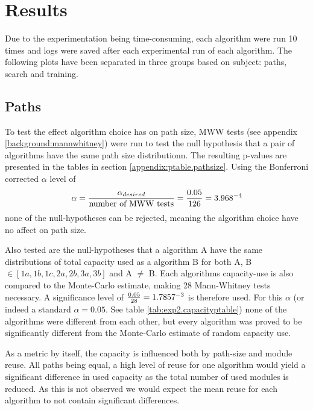 \section{Results}
\label{exp2:results}
Due to the experimentation being time-consuming, each algorithm were run 10 times and logs were saved after each experimental run of each algorithm. The following plots have been separated in three groups based on subject: paths, search and training. 

\subsection{Paths}
To test the effect algorithm choice has on path size, MWW tests (see appendix \ref{background:mannwhitney}) were run to test the null hypothesis that a pair of algorithms have the same path size distributionn. The resulting p-values are presented in the tables in section \ref{appendix:ptable.pathsize}. Using the Bonferroni corrected \(\alpha\) level of 
\begin{equation*}
    \alpha=\frac{\alpha_{desired}}{\text{number of MWW tests}}=\frac{0.05}{126}=3.968\time 10^{-4}
\end{equation*}
none of the null-hypotheses can be rejected, meaning the algorithm choice have no affect on path size. 

Also tested are the null-hypotheses that a algorithm A have the same distributions of total capacity used as a algorithm B for both A, B \(\in [1a, 1b, 1c, 2a, 2b, 3a, 3b]\) and A \(\neq\) B. Each algorithms capacity-use is also compared to the Monte-Carlo estimate, making 28 Mann-Whitney tests necessary. A significance level of \(\frac{0.05}{28}=1.7857\time 10^{-3}\) is therefore used. For this \(\alpha\) (or indeed a standard \(\alpha=0.05\). See table \ref{tab:exp2.capacityptable}) none of the algorithms were different from each other, but every algorithm was proved to be significantly different from the Monte-Carlo estimate of random capacity use. 

As a metric by itself, the capacity is influenced both by path-size and module reuse. All paths being equal, a high level of reuse for one algorithm would yield a significant difference in used capacity as the total number of used modules is reduced. As this is not observed we would expect the mean reuse for each algorithm to not contain significant differences.

